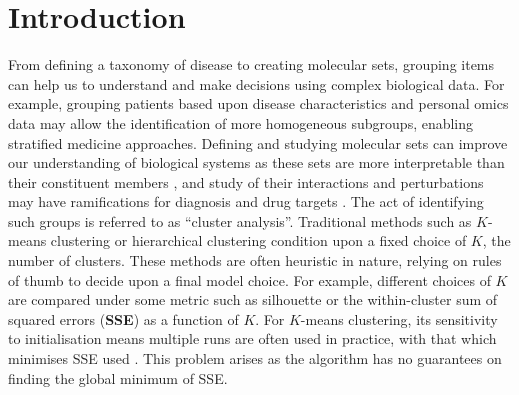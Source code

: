 \documentclass[12pt]{article}
\begin{document}
\section{Introduction}

From defining a taxonomy of disease to creating molecular sets, grouping items can help us to understand and make decisions using complex biological data. For example, grouping patients based upon disease characteristics and personal omics data may allow the identification of more homogeneous subgroups, enabling stratified medicine approaches. Defining and studying molecular sets can improve our understanding of biological systems as these sets are more interpretable than their constituent members \citep{hejblum2015time}, and study of their interactions and perturbations may have ramifications for diagnosis and drug targets \citep{bai2013strategic, emmert2014gene}. 
The act of identifying such groups is referred to as “cluster analysis”. Traditional methods such as $K$-means clustering \citep{lloyd1982least, forgy1965cluster} or hierarchical clustering condition upon a fixed choice of $K$, the number of clusters.  These methods are often heuristic in nature, relying on rules of thumb to decide upon a final model choice. For example, different choices of $K$ are compared under some metric such as silhouette or the within-cluster sum of squared errors (\textbf{SSE}) as a function of $K$. For $K$-means clustering, its sensitivity to initialisation means multiple runs are often used in practice, with that which minimises SSE used \citep{arthur2006k}. This problem arises as the algorithm has no guarantees on finding the global minimum of SSE.
\end{document}
